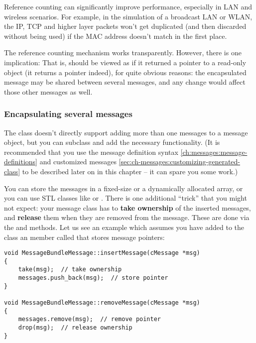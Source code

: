 Reference counting can significantly improve performance, especially
in LAN and wireless scenarios. For example, in the simulation of a
broadcast LAN or WLAN, the IP, TCP and higher layer packets won't
get duplicated (and then discarded without being used) if the
MAC address doesn't match in the first place.

The reference counting mechanism works transparently. However, there
is one implication:  That is,
 should be viewed as if it returned a
pointer to a read-only object (it returns a  pointer
indeed), for quite obvious reasons: the encapsulated message may be
shared between several messages, and any change would affect those
other messages as well.


\subsubsection{Encapsulating several messages}

The  class doesn't directly support adding more than one
messages to a message object, but you can subclass 
and add the necessary functionality. (It is recommended that you
use the message definition syntax \ref{ch:messages:message-definitions}
and customized messages \ref{sec:ch-messages:customizing-generated-class}
to be described later on in this chapter -- it can spare you some work.)

You can store the messages in a fixed-size or a dynamically allocated
array, or you can use STL classes like  or .
There is one additional ``trick'' that you might not expect: your message
class has to \textbf{take ownership} of the inserted messages, and
\textbf{release} them when they are removed from the message. These are
done via the  and  methods. Let us see
an example which assumes you have added to the class an  member
called  that stores message pointers:

\begin{verbatim}
void MessageBundleMessage::insertMessage(cMessage *msg)
{
    take(msg);  // take ownership
    messages.push_back(msg);  // store pointer
}

void MessageBundleMessage::removeMessage(cMessage *msg)
{
    messages.remove(msg);  // remove pointer
    drop(msg);  // release ownership
}
\end{verbatim}

